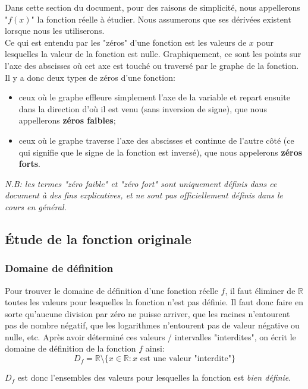 \documentclass{article}
\begin{document}
Dans cette section du document, pour des raisons de simplicité, nous appellerons "\(f(x)\)" la fonction réelle à étudier. Nous assumerons que ses dérivées existent lorsque nous les utiliserons. \\
Ce qui est entendu par les "zéros" d'une fonction est les valeurs de \(x\) pour lesquelles la valeur de la fonction est nulle. Graphiquement, ce sont les points sur l'axe des abscisses où cet axe est touché ou traversé par le graphe de la fonction. \\
Il y a donc deux types de zéros d'une fonction: 
\begin{itemize}
	\item ceux où le graphe effleure simplement l'axe de la variable et repart ensuite dans la direction d'où il est venu (sans inversion de signe), que nous appellerons \textbf{zéros faibles};
	\item ceux où le graphe traverse l'axe des abscisses et continue de l'autre côté (ce qui signifie que le signe de la fonction est inversé), que nous appelerons \textbf{zéros forts}.
\end{itemize}
\emph{N.B: les termes "zéro faible" et "zéro fort" sont uniquement définis dans ce document à des fins explicatives, et ne sont pas officiellement définis dans le cours en général.}

\subsection{Étude de la fonction originale}

\subsubsection{Domaine de définition}
Pour trouver le domaine de définition d'une fonction réelle \(f\), il faut éliminer de \(\mathbb{R}\) toutes les valeurs pour lesquelles la fonction n'est pas définie. Il faut donc faire en sorte qu'aucune division par zéro ne puisse arriver, que les racines n'entourent pas de nombre négatif, que les logarithmes n'entourent pas de valeur négative ou nulle, etc. Après avoir déterminé ces valeurs / intervalles "interdites", on écrit le domaine de définition de la fonction \(f\) ainsi:
\begin{equation*}
	D_f = \mathbb{R} \setminus \{ x \in \mathbb{R} : x \text{ est une valeur "interdite"} \}
\end{equation*}

\(D_f\) est donc l'ensembles des valeurs pour lesquelles la fonction est \emph{bien définie}.
\end{document}
